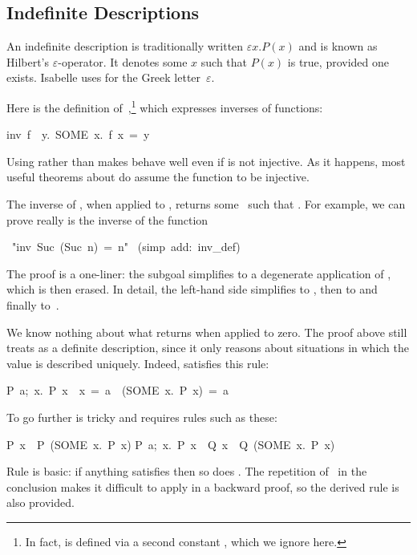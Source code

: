\subsection{Indefinite Descriptions}

%
%
An indefinite description is traditionally written $\varepsilon x. P(x)$ and is
known as Hilbert's $\varepsilon$-operator.  It denotes
some $x$ such that $P(x)$ is true, provided one exists.
Isabelle uses  for the Greek letter~$\varepsilon$.

Here is the definition of~,\footnote{In fact,  is defined via a second constant , which we ignore here.} which expresses inverses of
functions:
\begin{isabelle}
inv\ f\ \isasymequiv \ \isasymlambda y.\ SOME\ x.\ f\ x\ =\ y%
\end{isabelle}
Using  rather than  makes  behave well
even if  is not injective.  As it happens, most useful theorems about
 do assume the function to be injective.

The inverse of , when applied to , returns some~ such that
.  For example, we can prove  really is the inverse
of the  function 
\begin{isabelle}
\ "inv\ Suc\ (Suc\ n)\ =\ n"\isanewline
{}\ (simp\ add:\ inv_def)
\end{isabelle}

\noindent
The proof is a one-liner: the subgoal simplifies to a degenerate application of
, which is then erased.  In detail, the left-hand side simplifies
to , then to  and
finally to~.  

We know nothing about what
 returns when applied to zero.  The proof above still treats
 as a definite description, since it only reasons about
situations in which the value is described uniquely.  Indeed, 
satisfies this rule:
\begin{isabelle}
\isasymlbrakk P\ a;\ \isasymAnd x.\ P\ x\ \isasymLongrightarrow \ x\ =\ a\isasymrbrakk \ 
\isasymLongrightarrow \ (SOME\ x.\ P\ x)\ =\ a%
\end{isabelle}
To go further is
tricky and requires rules such as these:
\begin{isabelle}
P\ x\ \isasymLongrightarrow \ P\ (SOME\ x.\ P\ x)
\isanewline
\isasymlbrakk P\ a;\ \isasymAnd x.\ P\ x\ \isasymLongrightarrow \ Q\
x\isasymrbrakk \ \isasymLongrightarrow \ Q\ (SOME\ x.\ P\ x)
\rulenamedx{someI2}
\end{isabelle}
Rule  is basic: if anything satisfies  then so does
\hbox{}.  The repetition of~ in the conclusion makes it
difficult to apply in a backward proof, so the derived rule  is
also provided. 

